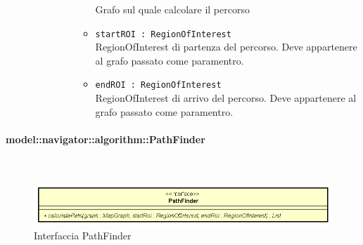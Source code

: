 \documentclass[../DefinizioneDiProdotto.tex]{subfiles}
\begin{document}
\begin{description}
\begin{itemize}
\begin{description}
\begin{itemize}
				Grafo sul quale calcolare il percorso\item \texttt{startROI : RegionOfInterest}\\
				RegionOfInterest di partenza del percorso. Deve appartenere al grafo passato come paramentro.\item \texttt{endROI : RegionOfInterest}\\
				RegionOfInterest di arrivo del percorso. Deve appartenere al grafo passato come paramentro.\end{itemize}
		\end{description}
	\end{itemize}
\end{description}

\paragraph{model::navigator::algorithm::PathFinder}
\
\begin{figure}[H]
	\centering
	\includegraphics[width=\maxwidth]{img/PathFinder.png}
	\caption{Interfaccia PathFinder}\label{fig:model::navigator::algorithm::PathFinder} 
\end{figure}
\end{document}
